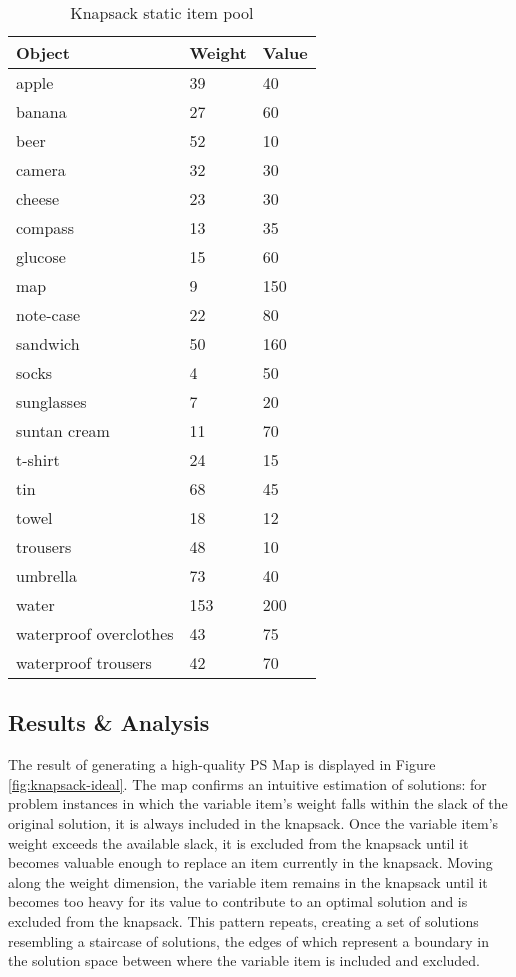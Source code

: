 \begin{table}
\begin{center}
  \begin{tabular}{|p{5cm}|p{1.5cm}|p{1.5cm}|}
    \hline
    \textbf{Object} & \textbf{Weight} & \textbf{Value} \\ \hline
    apple & 39 & 40 \\ \hline
    banana & 27 & 60 \\ \hline
    beer & 52 & 10 \\ \hline
    camera & 32 & 30 \\ \hline
    cheese & 23 & 30 \\ \hline
    compass & 13 & 35 \\ \hline
    glucose & 15 & 60 \\ \hline
    map & 9 & 150 \\ \hline
    note-case & 22 & 80 \\ \hline
    sandwich & 50 & 160 \\ \hline
    socks & 4 & 50 \\ \hline
    sunglasses & 7 & 20 \\ \hline
    suntan cream & 11 & 70 \\ \hline
    t-shirt & 24 & 15 \\ \hline
    tin & 68 & 45 \\ \hline
    towel & 18 & 12 \\ \hline
    trousers & 48 & 10 \\ \hline
    umbrella & 73 & 40 \\ \hline
    water & 153 & 200 \\ \hline
    waterproof overclothes & 43 & 75 \\ \hline
    waterproof trousers & 42 & 70 \\
    \hline
  \end{tabular}
  \caption{Knapsack static item pool}
  \label{tab:knapsack-item-pool}
\end{center}
\end{table}

\subsection{Results \& Analysis}

The result of generating a high-quality PS Map is displayed in Figure \ref{fig:knapsack-ideal}.  The map confirms an intuitive estimation of solutions: for problem instances in which the variable item's weight falls within the slack of the  original solution, it is always included in the knapsack.  Once the variable item's weight exceeds the available slack, it is excluded from the knapsack until it becomes valuable enough to replace an item currently in the knapsack.  Moving along the weight dimension, the variable item remains in the knapsack until it becomes too heavy for its value to contribute to an optimal solution and is excluded from the knapsack.  This pattern repeats, creating a set of solutions resembling a staircase of solutions, the edges of which represent a boundary in the solution space between where the variable item is included and excluded.


